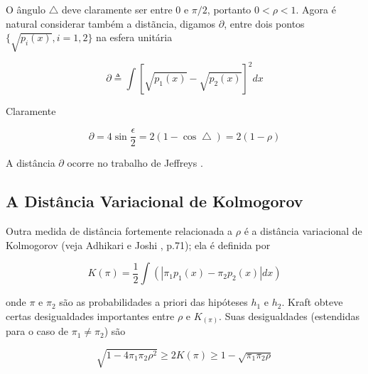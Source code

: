 \documentclass{sbrt2017port}
\begin{document}
O ângulo $\bigtriangleup$ deve claramente ser entre $0$ e $\pi/2$, portanto $0 < \rho < 1$. Agora é natural considerar também a distãncia, digamos $\partial$, entre dois pontos  $ \{ \sqrt{p_i(x)}, i=1,2 \} $ na esfera unitária

\begin{equation}
 \partial \triangleq \int {[\sqrt{p_1(x)} - \sqrt{p_2(x)}]}^2dx
 \label{eq42}
\end{equation}

Claramente

\begin{equation}
 \partial = 4 \sin \frac{\epsilon}{2} = 2(1-\cos \bigtriangleup) = 2(1-\rho)
 \label{eq43}
\end{equation}

A distância $\partial$ ocorre no trabalho de Jeffreys \cite{r7,r16}.

\subsection{A Distância Variacional de Kolmogorov}

Outra medida de distância fortemente relacionada a $\rho$ é a distância variacional de Kolmogorov (veja Adhikari e Joshi \cite{r23}, p.71); ela é definida por

\begin{equation}
	K(\pi) = \frac{1}{2}\int (|\pi_1p_1(x)-\pi_2p_2(x)|dx)
	\label{eq44}
\end{equation}

onde $\pi$ e $\pi_2$ são as probabilidades a priori das hipóteses $h_1$ e $h_2$. Kraft \cite{r24} obteve certas desigualdades importantes entre $\rho$ e $K_{(\pi)}$. Suas desigualdades (estendidas para o caso de $\pi_1 \neq \pi_2$) são

\begin{equation}
	\sqrt{1-4\pi_1\pi_2\rho^2} \geq 2K(\pi) \geq 1 - \sqrt{\pi_1\pi_2\rho}
	\label{eq45}
\end{equation}
\end{document}

